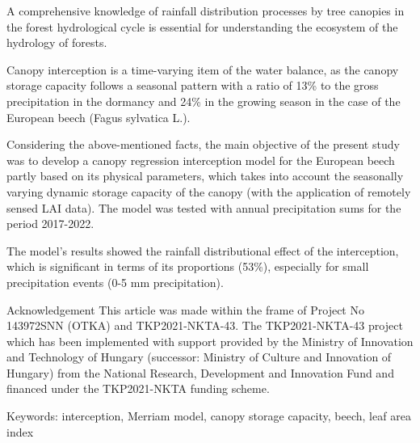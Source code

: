 \noindent

A comprehensive knowledge of rainfall distribution processes by tree canopies in the forest hydrological cycle is essential for understanding the ecosystem of the hydrology of forests.

Canopy interception is a time-varying item of the water balance, as the canopy storage capacity follows a seasonal pattern with a ratio of 13\% to the gross precipitation in the dormancy and 24\% in the growing season in the case of the European beech (Fagus sylvatica L.).

Considering the above-mentioned facts, the main objective of the present study was to develop a canopy regression interception model for the European beech partly based on its physical parameters, which takes into account the seasonally varying dynamic storage capacity of the canopy (with the application of remotely sensed LAI data). The model was tested with annual precipitation sums for the period 2017-2022.

The model’s results showed the rainfall distributional effect of the interception, which is significant in terms of its proportions (53\%), especially for small precipitation events (0-5 mm precipitation).

Acknowledgement
This article was made within the frame of Project No 143972SNN (OTKA) and TKP2021-NKTA-43. The TKP2021-NKTA-43 project which has been implemented with support provided by the Ministry of Innovation and Technology of Hungary (successor: Ministry of Culture and Innovation of Hungary) from the National Research, Development and Innovation Fund and financed under the TKP2021-NKTA funding scheme.

Keywords: interception, Merriam model, canopy storage capacity, beech, leaf area index
\newpage{}
